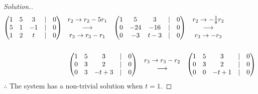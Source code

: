 \documentclass[11pt,a4paper]{article}
\theoremstyle{definition}
\newenvironment{solution}
  {\renewcommand{\qedsymbol}{}\begin{proof}[\textit{Solution}.]}
  {\end{proof}}
\begin{document}
\begin{solution}
\begin{align*}
\begin{pmatrix}
1&5&3&|&0\\5&1&-1&|&0\\1&2&t&|&0\\
\end{pmatrix}
& \hspace{0.3cm}
\begin{matrix}
r_2\rightarrow r_2-5r_1\\ \longrightarrow\\ r_3\rightarrow r_3-r_1\\
\end{matrix}
\hspace{0.3cm}
\begin{pmatrix}
1&5&3&|&0\\0&-24&-16&|&0\\ 0&-3&t-3&|&0\\
\end{pmatrix}
\hspace{0.3cm}
\begin{matrix}
r_2\rightarrow -\frac{1}{8}r_2\\ \longrightarrow\\ r_3\rightarrow -r_3\\
\end{matrix}\\\\
&
\hspace{0.3cm}
\begin{pmatrix}
1&5&3&|&0\\ 0&3&2&|&0\\0&3&-t+3&|&0\\
\end{pmatrix}
\hspace{0.3cm}
\begin{matrix}
r_3\rightarrow r_3-r_2\\ \longrightarrow\\
\end{matrix}
\hspace{0.3cm}
\begin{pmatrix}
1&5&3&|&0\\ 0&3&2&|&0\\0&0&-t+1&|&0\\
\end{pmatrix}
\end{align*}
$\therefore$ The system has a non-trivial solution when $t=1$.
\end{solution}
\end{document}
